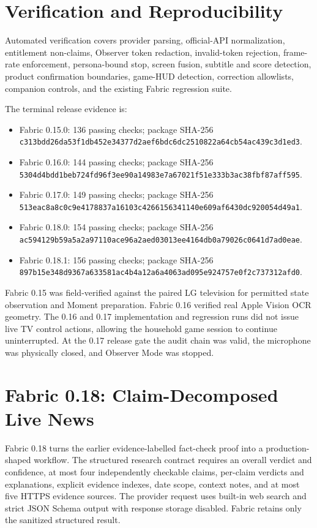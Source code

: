 \documentclass[11pt,a4paper]{article}
\begin{document}
\section{Verification and Reproducibility}

Automated verification covers provider parsing, official-API normalization,
entitlement non-claims, Observer token redaction, invalid-token rejection,
frame-rate enforcement, persona-bound stop, screen fusion, subtitle and score
detection, product confirmation boundaries, game-HUD detection, correction
allowlists, companion controls, and the existing Fabric regression suite.

The terminal release evidence is:

\begin{itemize}[leftmargin=*]
  \item Fabric 0.15.0: 136 passing checks; package SHA-256
        \nolinkurl{c313bdd26da53f1db452e34377d2aef6bdc6dc2510822a64cb54ac439c3d1ed3}.
  \item Fabric 0.16.0: 144 passing checks; package SHA-256
        \nolinkurl{5304d4bdd1beb724fd96f3ee90a14983e7a67021f51e333b3ac38fbf87aff595}.
  \item Fabric 0.17.0: 149 passing checks; package SHA-256
        \nolinkurl{513eac8a8c0c9e4178837a16103c4266156341140e609af6430dc920054d49a1}.
  \item Fabric 0.18.0: 154 passing checks; package SHA-256
        \nolinkurl{ac594129b59a5a2a97110ace96a2aed03013ee4164db0a79026c0641d7ad0eae}.
  \item Fabric 0.18.1: 156 passing checks; package SHA-256
        \nolinkurl{897b15e348d9367a633581ac4b4a12a6a4063ad095e924757e0f2c737312afd0}.
\end{itemize}

Fabric 0.15 was field-verified against the paired LG television for permitted
state observation and Moment preparation.  Fabric 0.16 verified real Apple
Vision OCR geometry.  The 0.16 and 0.17 implementation and regression runs did
not issue live TV control actions, allowing the household game session to
continue uninterrupted.  At the 0.17 release gate the audit chain was valid,
the microphone was physically closed, and Observer Mode was stopped.

\section{Fabric 0.18: Claim-Decomposed Live News}

Fabric 0.18 turns the earlier evidence-labelled fact-check proof into a
production-shaped workflow.  The structured research contract requires an
overall verdict and confidence, at most four independently checkable claims,
per-claim verdicts and explanations, explicit evidence indexes, date scope,
context notes, and at most five HTTPS evidence sources.  The provider request
uses built-in web search and strict JSON Schema output with response storage
disabled.  Fabric retains only the sanitized structured result.
\end{document}
